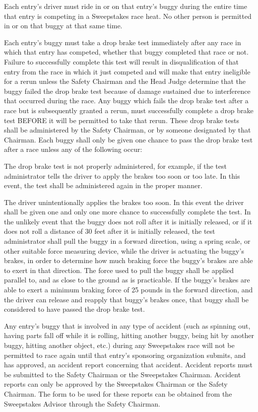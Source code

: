 Each entry's driver must ride in or on that entry's buggy during the entire time that entry is competing in a Sweepstakes race heat. No other person is permitted in or on that buggy at that same time.

Each entry's buggy must take a drop brake test immediately after any race in which that entry has competed, whether that buggy completed that race or not. Failure to successfully complete this test will result in disqualification of that entry from the race in which it just competed and will make that entry ineligible for a rerun unless the Safety Chairman and the Head Judge determine that the buggy failed the drop brake test because of damage sustained due to interference that occurred during the race. Any buggy which fails the drop brake test after a race but is subsequently granted a rerun, must successfully complete a drop brake test BEFORE it will be permitted to take that rerun. These drop brake tests shall be administered by the Safety Chairman, or by someone designated by that Chairman. Each buggy shall only be given one chance to pass the drop brake test after a race unless any of the following occur:

The drop brake test is not properly administered, for example, if the test administrator tells the driver to apply the brakes too soon or too late. In this event, the test shall be administered again in the proper manner.

The driver unintentionally applies the brakes too soon. In this event the driver shall be given one and only one more chance to successfully complete the test. In the unlikely event that the buggy does not roll after it is initially released, or if it does not roll a distance of 30 feet after it is initially released, the test administrator shall pull the buggy in a forward direction, using a spring scale, or other suitable force measuring device, while the driver is actuating the buggy's brakes, in order to determine how much braking force the buggy's brakes are able to exert in that direction. The force used to pull the buggy shall be applied parallel to, and as close to the ground as is practicable. If the buggy's brakes are able to exert a minimum braking force of 25 pounds in the forward direction, and the driver can release and reapply that buggy's brakes once, that buggy shall be considered to have passed the drop brake test.

Any entry's buggy that is involved in any type of accident (such as spinning out, having parts fall off while it is rolling, hitting another buggy, being hit by another buggy, hitting another object, etc.) during any Sweepstakes race will not be permitted to race again until that entry's sponsoring organization submits, and has approved, an accident report concerning that accident. Accident reports must be submitted to the Safety Chairman or the Sweepstakes Chairman. Accident reports can only be approved by the Sweepstakes Chairman or the Safety Chairman. The form to be used for these reports can be obtained from the Sweepstakes Advisor through the Safety Chairman.

